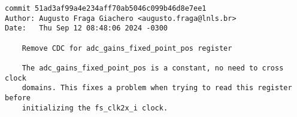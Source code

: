 \begin{verbatim}
commit 51ad3af99a4e234aff70ab5046c099b46d8e7ee1
Author: Augusto Fraga Giachero <augusto.fraga@lnls.br>
Date:   Thu Sep 12 08:48:06 2024 -0300

    Remove CDC for adc_gains_fixed_point_pos register
    
    The adc_gains_fixed_point_pos is a constant, no need to cross clock
    domains. This fixes a problem when trying to read this register before
    initializing the fs_clk2x_i clock.
\end{verbatim}
